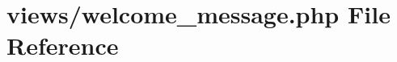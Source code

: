 \hypertarget{welcome__message_8php}{}\section{views/welcome\+\_\+message.php File Reference}
\label{welcome__message_8php}
